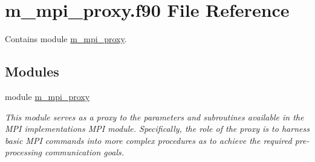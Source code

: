 \hypertarget{m__mpi__proxy_8f90}{}\section{m\+\_\+mpi\+\_\+proxy.\+f90 File Reference}
\label{m__mpi__proxy_8f90}


Contains module \hyperlink{namespacem__mpi__proxy}{m\+\_\+mpi\+\_\+proxy}.  


\subsection*{Modules}
\begin{DoxyCompactItemize}
\item 
module \hyperlink{namespacem__mpi__proxy}{m\+\_\+mpi\+\_\+proxy}
\begin{DoxyCompactList}\small\item\em This module serves as a proxy to the parameters and subroutines available in the M\+PI implementation\textquotesingle{}s M\+PI module. Specifically, the role of the proxy is to harness basic M\+PI commands into more complex procedures as to achieve the required pre-\/processing communication goals. \end{DoxyCompactList}\end{DoxyCompactItemize}
